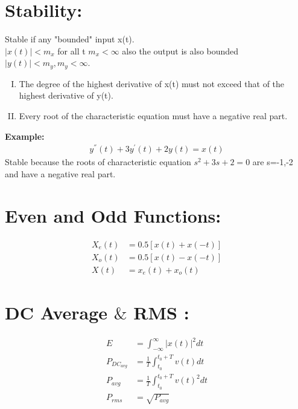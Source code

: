 \documentclass[13pt,a4paper]{article}
\begin{document}
\section{Stability:}
Stable if any "bounded" input x(t). \\
$|x(t)|<m_x$ for all t $m_x<\infty$ also the output is also bounded $|y(t)|<m_y  , m_y<\infty$.\\
\begin{enumerate}[I)]
    \item The degree of the highest derivative of x(t) must not exceed that of the highest derivative of y(t).
    \item Every root of the characteristic equation must have a negative real part.
\end{enumerate}
\textbf{Example:}
\begin{gather*}
    y^{''}(t)+3y^{'}(t)+2y(t)=x(t)
\end{gather*}
Stable because the roots of characteristic equation $s^2+3s+2=0$ are s=-1,-2 and have a negative real part.
\section{Even and Odd Functions:}
\begin{align*}
    X_e(t) &=0.5[x(t)+x(-t)]\\
    X_o(t) &=0.5[x(t)-x(-t)]\\
    X(t) &=x_e(t)+x_o(t)
\end{align*}
\section{DC Average $\&$ RMS :}
\begin{align*}
    E &=\int_{-\infty}^{\infty}|x(t)|^2dt\\
    P_{DC_{avg}} &=\frac{1}{T}\int^{t_0+T}_{t_0}v(t)dt\\
    P_{avg} &=\frac{1}{T}\int^{t_0+T}_{t_0}v(t)^2dt\\
    P_{rms} &=\sqrt{P_{avg}} 
\end{align*}
\end{document}
